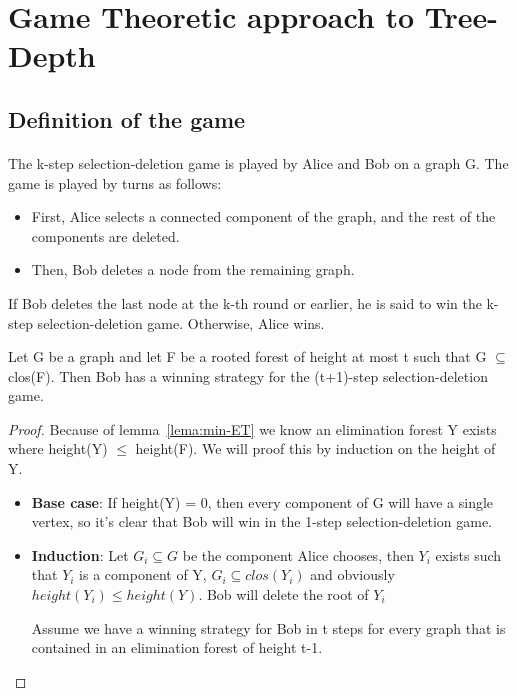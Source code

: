 \section{Game Theoretic approach to Tree-Depth}

\subsection{Definition of the game}
\paragraph{}
The k-step selection-deletion game is played by Alice and Bob on a graph G. The game is played by turns as follows:
\begin{itemize}
  \item First, Alice selects a connected component of the graph, and the rest of the components are deleted.
  \item Then, Bob deletes a node from the remaining graph.
\end{itemize}

If Bob deletes the last node at the k-th round or earlier, he is said to win the k-step selection-deletion game. Otherwise, Alice wins.

\begin{lemma}
Let G be a graph and let F be a rooted forest of height at most t such that G $\subseteq$ clos(F). Then Bob has a winning strategy for the (t+1)-step selection-deletion game.
\end{lemma}
\begin{proof}
Because of lemma~\ref{lema:min-ET} we know an elimination forest Y exists where height(Y) $\leq$ height(F).
We will proof this by induction on the height of Y.
\begin{itemize}
  \item \textbf{Base case}: If height(Y) = 0, then every component of G will have a single vertex, so it's clear that Bob will win in the 1-step selection-deletion game.
  \item \textbf{Induction}: Let $G_i \subseteq G$ be the component Alice chooses, then $Y_i$ exists such that $Y_i$ is a component of Y, $G_i \subseteq clos(Y_i)$ and obviously $height(Y_i) \leq height(Y)$. Bob will delete the root of $Y_i$
  
  Assume we have a winning strategy for Bob in t steps for every graph that is contained in an elimination forest of height t-1.
\end{itemize}
\end{proof}